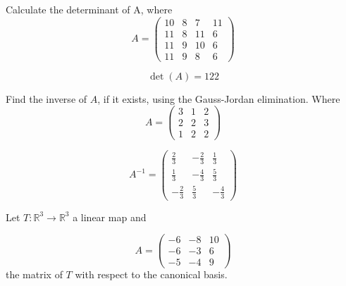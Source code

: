 \begin{questions}

\question Calculate the determinant of A, where
$$
A=\left(\begin{array}{rrrr}
10 & 8 & 7 & 11 \\
11 & 8 & 11 & 6 \\
11 & 9 & 10 & 6 \\
11 & 9 & 8 & 6
\end{array}\right)
$$

\begin{solution}
$$\det(A)=122$$
\end{solution}

\question Find the inverse of $A$, if it exists, using the Gauss-Jordan elimination. Where
$$
A=\left(\begin{array}{rrr}
3 & 1 & 2 \\
2 & 2 & 3 \\
1 & 2 & 2
\end{array}\right)
$$

\begin{solution}
$$A^{-1}=\left(\begin{array}{rrr}
\frac{2}{3} & -\frac{2}{3} & \frac{1}{3} \\
\frac{1}{3} & -\frac{4}{3} & \frac{5}{3} \\
-\frac{2}{3} & \frac{5}{3} & -\frac{4}{3}
\end{array}\right)$$
\end{solution}

\question Let $T:\mathbb{R}^3\rightarrow\mathbb{R}^3$  a linear map and
 
$$
A=\left(\begin{array}{rrr}
-6 & -8 & 10 \\
-6 & -3 & 6 \\
-5 & -4 & 9
\end{array}\right)
$$
the matrix of $T$ with respect to the canonical basis.
\end{questions}
